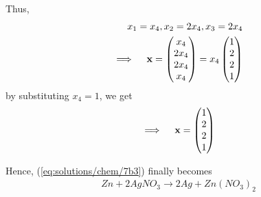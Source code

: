 Thus,
\begin{align}
    x_1 = x_4, x_ 2 = 2x_4, x_3 = 2x_4\\
    \implies \quad\mathbf{x } = \begin{pmatrix} x_{4} \\ 2x_{4}\\ 2x_{4} \\ x_{4}\end{pmatrix}   =  x_4 \begin{pmatrix} 1\\ 2 \\ 2 \\1\end{pmatrix}
    \end{align} 
by substituting $x_4= 1$, we get 
\begin{align}
 \implies \quad\mathbf{x} = \begin{pmatrix} 1\\ 2 \\ 2 \\1\end{pmatrix}
\end{align}

Hence, (\ref{eq:solutions/chem/7b3}) finally becomes
\begin{align}
Zn + 2AgNO_{3} \to 2Ag + Zn(NO_{3})_{2}
\end{align}
